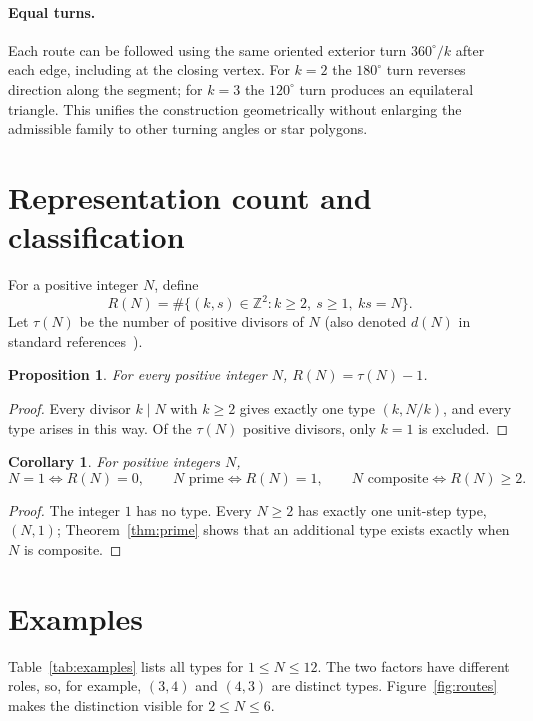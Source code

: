 \documentclass[11pt,a4paper]{article}
\newtheorem{proposition}[theorem]{Proposition}
\newtheorem{corollary}[theorem]{Corollary}
\theoremstyle{definition}
\begin{document}
\paragraph{Equal turns.}
Each route can be followed using the same oriented exterior turn
$360^\circ/k$ after each edge, including at the closing vertex.
For $k=2$ the $180^\circ$ turn reverses direction along the segment;
for $k=3$ the $120^\circ$ turn produces an equilateral triangle.
This unifies the construction geometrically without enlarging the
admissible family to other turning angles or star polygons.

\section{Representation count and classification}
For a positive integer $N$, define
\[
 R(N)=\#\{(k,s)\in\mathbb Z^2:k\ge2,\ s\ge1,\ ks=N\}.
\]
Let $\tau(N)$ be the number of positive divisors of $N$ (also denoted
$d(N)$ in standard references~\cite{apostolDLMF27}).
\begin{proposition}\label{prop:count}
For every positive integer $N$, $R(N)=\tau(N)-1$.
\end{proposition}
\begin{proof}
Every divisor $k\mid N$ with $k\ge2$ gives exactly one type
$(k,N/k)$, and every type arises in this way. Of the $\tau(N)$
positive divisors, only $k=1$ is excluded.
\end{proof}
\begin{corollary}\label{cor:classification}
For positive integers $N$,
\[
 N=1\iff R(N)=0,\qquad
 N\text{ prime}\iff R(N)=1,\qquad
 N\text{ composite}\iff R(N)\ge2.
\]
\end{corollary}
\begin{proof}
The integer $1$ has no type. Every $N\ge2$ has exactly one unit-step
type, $(N,1)$; Theorem~\ref{thm:prime} shows that an additional type
exists exactly when $N$ is composite.
\end{proof}

\newpage
\section{Examples}
Table~\ref{tab:examples} lists all types for $1\le N\le12$.
The two factors have different roles, so, for example, $(3,4)$ and
$(4,3)$ are distinct types. Figure~\ref{fig:routes} makes the distinction
visible for $2\le N\le6$.
\end{document}
